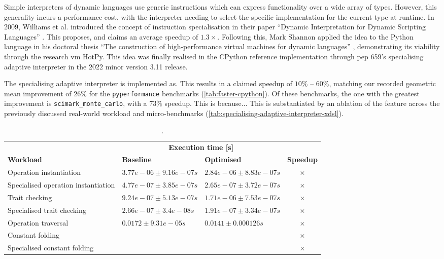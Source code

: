 Simple interpreters of dynamic languages use generic instructions which can express functionality over a wide array of types. However, this generality incurs a performance cost, with the interpreter needing to select the specific implementation for the current type at runtime.
In 2009, Williams et al. introduced the concept of instruction specialisation in their paper ``Dynamic Interpretation for Dynamic Scripting Languages'' \cite{williamsDynamicInterpretationDynamic2010}.
This proposes, and claims an average speedup of $1.3\times$.
Following this, Mark Shannon applied the idea to the Python language in his doctoral thesis ``The construction of high-performance virtual
machines for dynamic languages'' \cite{shannonConstructionHighperformanceVirtual2011}, demonstrating its viability through the research \ac{vm} HotPy.
This idea was finally realised in the CPython reference implementation through \ac{pep} 659's specialising adaptive interpreter in the 2022 minor version 3.11 release.

The specialising adaptive interpreter is implemented as.
This results in a claimed speedup of $10\%$ -- $60\%$, matching our recorded geometric mean improvement of $26\%$ for the \texttt{pyperformance} benchmarks (\autoref{tab:faster-cpython}).
Of these benchmarks, the one with the greatest improvement is \texttt{scimark\_monte\_carlo}, with a $73\%$ speedup. This is because...
This is substantiated by an ablation of the feature across the previously discussed real-world workload and micro-benchmarks (\autoref{tab:specialising-adaptive-interpreter-xdsl}).

\begin{table}[H]
  \caption{.}
  \label{tab:specialising-adaptive-interpreter-xdsl}
  \centering
  \begin{tabular}{lllc}
    \toprule
    & \multicolumn{2}{c}{\textbf{Execution time [s]}} \\
    \cmidrule(r){2-3}
    \textbf{Workload}& \textbf{Baseline} & \textbf{Optimised} & \textbf{Speedup} \\
    \midrule
    Operation instantiation & $3.77e-06 ± 9.16e-07s$ & $2.84e-06 ± 8.83e-07s$ & $\times$ \\
    Specialised operation instantiation & $4.77e-07 ± 3.85e-07s$ & $2.65e-07 ± 3.72e-07s$ & $\times$ \\
    Trait checking & $9.24e-07 ± 5.13e-07s$ & $1.71e-06 ± 7.53e-07s$ & $\times$ \\
    Specialised trait checking & $2.66e-07 ± 3.4e-08s$ & $1.91e-07 ± 3.34e-07s$ & $\times$ \\
    Operation traversal & $0.0172 ± 9.31e-05s$ & $0.0141 ± 0.000126s$ & $\times$ \\ %
    Constant folding & $ $ & $ $ & $\times$ \\
    Specialised constant folding & $ $ & $ $ & $\times$ \\
    \bottomrule
  \end{tabular}
\end{table}


